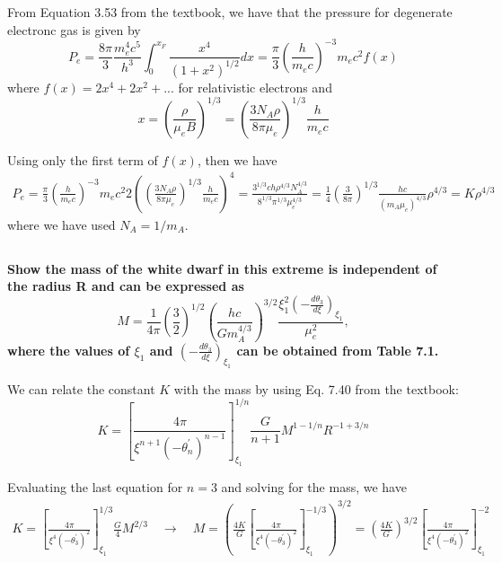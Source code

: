 From Equation 3.53 from the textbook, we have that the pressure for degenerate electronc gas is given by
\begin{equation*}
    P_e = \frac{8\pi}{3}\frac{m_e^4c^5}{h^3}\int^{x_F}_0\frac{x^4}{(1+x^2)^{1/2}}dx = \frac{\pi}{3}\left(\frac{h}{m_ec}\right)^{-3}m_ec^2 f(x)
\end{equation*}
where $f(x)=2x^4 + 2x^2 + ... $ for relativistic electrons and 
\begin{equation*}
    x = \left(\frac{\rho}{\mu_eB}\right)^{1/3} = \left(\frac{3 N_A \rho}{8\pi \mu_e}\right)^{1/3}\frac{h}{m_ec}
\end{equation*}

Using only the first term of $f(x)$, then we have 
\begin{align*}
    P_e = \frac{\pi}{3}\left(\frac{h}{m_ec}\right)^{-3}m_ec^2 2\left( \left(\frac{3 N_A \rho}{8\pi \mu_e}\right)^{1/3}\frac{h}{m_ec}\right)^4 = \frac{3^{1/3}ch\rho^{4/3}N_A^{4/3}}{8^{1/3}\pi^{1/3}\mu_e^{4/3}} = \frac{1}{4}\left(\frac{3}{8\pi}\right)^{1/3}\frac{hc}{(m_A\mu_e)^{4/3}}\rho^{4/3} = K \rho^{4/3}
\end{align*}
where we have used $N_A = 1/m_A$. 



\subsection{}
\textbf{Show the mass of the white dwarf in this extreme is independent of the radius
R and can be expressed as
\begin{equation*}
    M = \frac{1}{4\pi}\left(\frac{3}{2}\right)^{1/2}\left(\frac{hc}{Gm_A^{4/3}}\right)^{3/2}\frac{\xi_1^2\left(-\frac{d\theta_3}{d\xi}\right)_{\xi_1}}{\mu_e^2},
\end{equation*}
where the values of $\xi_1$ and $\left(-\frac{d\theta_3}{d\xi}\right)_{\xi_1}$ can be obtained from Table 7.1.}

We can relate the constant $K$ with the mass by using Eq. 7.40 from the textbook:
\begin{equation}
    K = \left[\frac{4\pi}{\xi^{n+1}(-\theta^\prime_n)^{n-1}}\right]^{1/n}_{\xi_1}\frac{G}{n+1}M^{1-1/n}R^{-1+3/n}
    \label{eq:polytropeK}
\end{equation}

Evaluating the last equation for $n=3$ and solving for the mass, we have
\begin{align*}
    K = \left[\frac{4\pi}{\xi^{4}(-\theta^\prime_3)^{2}}\right]^{1/3}_{\xi_1}\frac{G}{4}M^{2/3} \quad\rightarrow\quad
    M = \left(\frac{4K}{G}\left[\frac{4\pi}{\xi^{4}(-\theta^\prime_3)^{2}}\right]^{-1/3}_{\xi_1}\right)^{3/2} = \left(\frac{4K}{G}\right)^{3/2}\left[\frac{4\pi}{\xi^{4}(-\theta^\prime_3)^{2}}\right]^{-2}_{\xi_1}
\end{align*}

